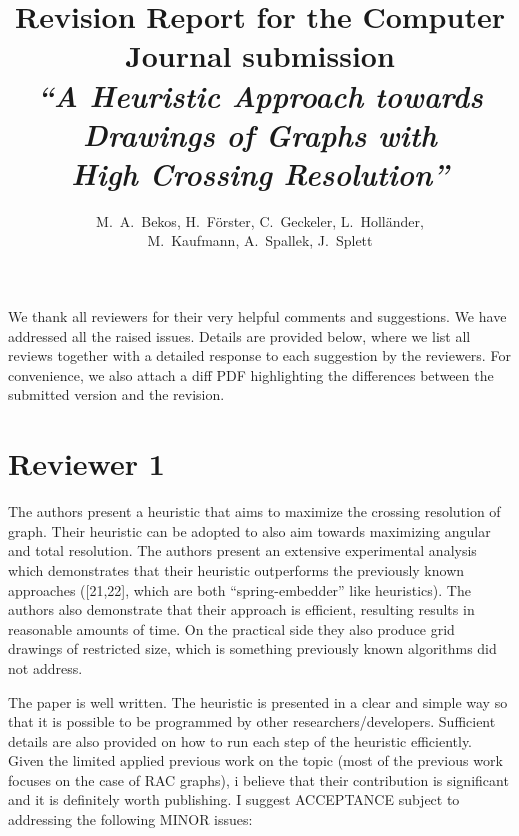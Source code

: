 \documentclass{article}
\title{{\normalsize Revision Report for the Computer Journal submission}\\
{\Large\em ``A Heuristic Approach towards Drawings of Graphs with\\High Crossing Resolution''}}
\author{}
\date{}
\author{M.~A.~Bekos, H.~F\"orster, C.~Geckeler, L.~Holl\"ander,\\M.~Kaufmann, A.~Spallek, J.~Splett}
\begin{document}
\maketitle

\noindent We thank all reviewers for their very helpful comments and suggestions. We have addressed all the raised issues. Details are provided below, where we list all reviews together with a detailed response to each suggestion by the reviewers. For convenience, we also attach a diff PDF highlighting the differences between the submitted version and the revision.

\newpage


\section*{Reviewer 1}

The authors present a heuristic that aims to maximize the crossing resolution of graph. Their heuristic can be adopted to also aim towards maximizing angular and total resolution. The authors present an extensive experimental analysis which demonstrates that their heuristic outperforms the previously known approaches ([21,22], which are both ``spring-embedder'' like heuristics). The authors also demonstrate that their approach is efficient, resulting results in reasonable amounts of time. On the practical side they also produce grid drawings of restricted size, which is something previously known algorithms did not address. 

The paper is well written. The heuristic is presented in a clear and simple way so that it is possible to be programmed by other researchers/developers. Sufficient details are also provided on how to run each step of the heuristic efficiently. Given the limited applied previous work on the topic (most of the previous work focuses on the case of RAC graphs), i believe that their contribution is significant and it is definitely worth publishing. I suggest ACCEPTANCE subject to addressing the following MINOR issues:
\end{document}
